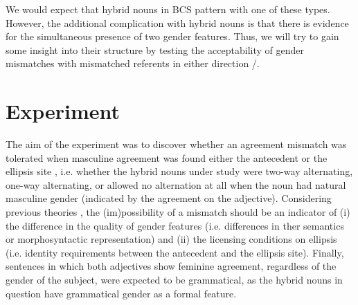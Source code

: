 \documentclass[output=paper,
modfonts,
newtxmath,
hidelinks
]{langscibook}
\begin{document}
\noindent We would expect that hybrid nouns in BCS pattern with one of these types. However, the additional complication with hybrid nouns is that there is evidence for the simultaneous presence of two gender features.
Thus, we will try to gain some insight into their structure by testing the acceptability of gender mismatches with mismatched referents in either direction /.

\ea
  		\label{14:ex8b}
  		\label{14:ex8c}
   \z \z
     
     
\section{Experiment}

The aim of the experiment was to discover whether an agreement mismatch was tolerated when masculine agreement was found either the antecedent  or the ellipsis site , i.e. whether the hybrid nouns under study were two-way alternating, one-way alternating, or allowed no alternation at all when the noun had natural masculine gender  (indicated by the agreement on the adjective). Considering previous theories \citep{nuneszocca10,bobaljikzocca,merchant14,sudospathas-sub20}, the (im)possibility of a mismatch should be an indicator of (i) the difference in the quality of gender features (i.e. differences in ther semantics or morphosyntactic representation) and (ii) the licensing conditions on ellipsis (i.e. identity requirements between the antecedent and the ellipsis site). Finally, sentences in which both adjectives show feminine agreement, regardless of the gender of the subject, were expected to be grammatical, as the hybrid nouns in question have grammatical gender as a formal feature. 
\end{document}
